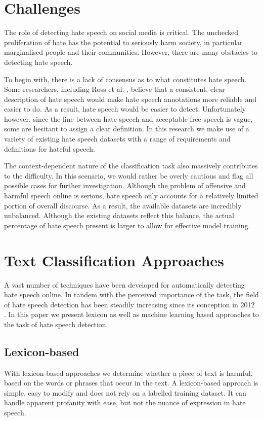 \documentclass[a4paper,12pt]{report}
\begin{document}
\section{Challenges}
The role of detecting hate speech on social media is critical. The unchecked proliferation of hate has the potential to seriously harm society, in particular marginalised people and their communities. However, there are many obstacles to detecting hate speech. 

To begin with, there is a lack of consensus as to what constitutes hate speech. Some researchers, including Ross et al. \cite{ross2017measuring}, believe that a consistent, clear description of hate speech would make hate speech annotations more reliable and easier to do. As a result, hate speech would be easier to detect. Unfortunately however, since the line between hate speech and acceptable free speech is vague, some are hesitant to assign a clear definition. In this research we make use of a variety of existing hate speech datasets with a range of requirements and definitions for hateful speech. 

The context-dependent nature of the classification task also massively contributes to the difficulty. In this scenario, we would rather be overly cautious and flag all possible cases for further investigation. Although the problem of offensive and harmful speech online is serious, hate speech only accounts for a relatively limited portion of overall discourse. As a result, the available datasets are incredibly unbalanced. Although the existing datasets reflect this balance, the actual percentage of hate speech present is larger to allow for effective model training. 

\section{Text Classification Approaches}
A vast number of techniques have been developed for automatically detecting hate speech online. In tandem with the perceived importance of the task, the field of hate speech detection has been steadily increasing since its conception in 2012 \cite{warner2012detecting}. In this paper we present lexicon as well as machine learning based approaches to the task of hate speech detection.

\subsection{Lexicon-based}
With lexicon-based approaches we determine whether a piece of text is harmful, based on the words or phrases that occur in the text. A lexicon-based approach is simple, easy to modify and does not rely on a labelled training dataset. It can handle apparent profanity with ease, but not the nuance of expression in hate speech.
\end{document}
